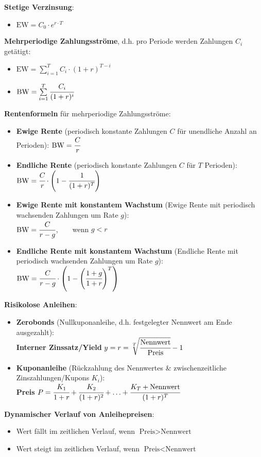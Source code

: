 \textbf{Stetige Verzinsung}:
\begin{itemize}
	\item $\text{EW}=C_0\cdot e^{r\cdot T}$
\end{itemize}

\textbf{Mehrperiodige Zahlungsströme}, d.h. pro Periode werden Zahlungen $C_i$ getätigt:
\begin{itemize}
	\item $\text{EW}=\sum\limits_{i=1}^{T}C_i\cdot (1+r)^{T-i}$
	\item $\text{BW}=\sum\limits_{i=1}^{T}\cfrac{C_i}{(1+r)^i}$
\end{itemize}

\textbf{Rentenformeln} für mehrperiodige Zahlungsströme:
\begin{itemize}
	\item \textbf{Ewige Rente} (periodisch konstante Zahlungen $C$ für unendliche Anzahl an Perioden): $\text{BW}=\cfrac{C}{r}$
	\item \textbf{Endliche Rente} (periodisch konstante Zahlungen $C$ für $T$ Perioden):\newline $\text{BW}=\cfrac{C}{r}\cdot \left(1-\cfrac{1}{(1+r)^T}\right)$
	\item \textbf{Ewige Rente mit konstantem Wachstum} (Ewige Rente mit periodisch wachsenden Zahlungen um Rate $g$):\\
	$\text{BW}=\cfrac{C}{r-g}$, $\;\;\;\;\;\;$wenn $g<r$
	\item \textbf{Endliche Rente mit konstantem Wachstum} (Endliche Rente mit periodisch wachsenden Zahlungen um Rate $g$):\\
	$\text{BW}=\cfrac{C}{r-g}\cdot\left(1-\left(\cfrac{1+g}{1+r}\right)^T\right)$
\end{itemize}

\textbf{Risikolose Anleihen}:
\begin{itemize}
	\item \textbf{Zerobonds} (Nullkuponanleihe, d.h. festgelegter Nennwert am Ende ausgezahlt):\\
	\textbf{Interner Zinssatz/Yield} $y=r=\sqrt[T]{\cfrac{\text{Nennwert}}{\text{Preis}}}-1$
	\item \textbf{Kuponanleihe} (Rückzahlung des Nennwertes \& zwischenzeitliche Zinszahlungen/Kupons $K_i$):\\
	\textbf{Preis} $P=\cfrac{K_1}{1+r}+\cfrac{K_2}{(1+r)^2}+\ldots+\cfrac{K_T+\text{Nennwert}}{(1+r)^T}$ 
\end{itemize}

\textbf{Dynamischer Verlauf von Anleihepreisen}:
\begin{itemize}
	\item Wert fällt im zeitlichen Verlauf, wenn $\text{Preis}>\text{Nennwert}$
	\item Wert steigt im zeitlichen Verlauf, wenn $\text{Preis}<\text{Nennwert}$
\end{itemize}
